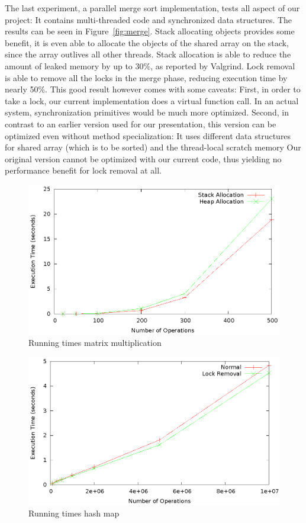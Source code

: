 \documentclass[letterpaper]{article}
\begin{document}
The last experiment, a parallel merge sort implementation, tests all aspect of our project: It contains multi-threaded code and synchronized
data structures. The results can be seen in Figure~\ref{fig:merge}. Stack allocating objects provides some benefit, it is even
able to allocate the objects of the shared array on the stack, since the array outlives all other threads. 
Stack allocation is able to reduce the amount of leaked memory by up to 30\%, as reported by Valgrind.
Lock removal is able to remove all the locks in the merge phase, reducing execution time by nearly 50\%. This
good result however comes with some caveats: First, in order to take a lock, our current implementation does a virtual function call. In
an actual system, synchronization primitives would be much more optimized. Second, in contrast to an earlier version used for our
presentation, this version can be optimized even without method specialization: It uses different data structures for shared array
(which is to be sorted) and the thread-local scratch memory 
Our original version cannot be optimized with our current code, thus yielding no performance benefit for lock removal at all.


\begin{figure} \center
 \includegraphics[width=0.8\linewidth]{results_matrix_mul.eps}
  \caption{Running times matrix multiplication}
  \label{fig:matrixmul}
\end{figure}

\begin{figure} \center
 \includegraphics[width=0.8\linewidth]{results_hash.eps}
  \caption{Running times hash map}
  \label{fig:hash}
\end{figure}
\end{document}
